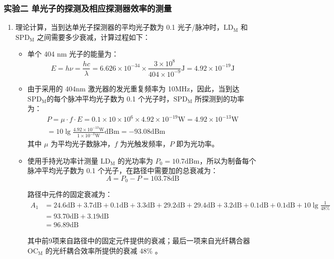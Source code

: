 \documentclass[dvipsnames, svgnames,a4paper,11pt]{article}
\begin{document}
	\subsubsection{实验二 \quad 单光子的探测及相应探测器效率的测量}
	\label{subsection2.1.2}

		\begin{enumerate}
			\item 理论计算，当到达单光子探测器的平均光子数为 0.1 光子/脉冲时，$\mathrm{LD_M}$ 和 $\mathrm{SPD_M}$ 之间需要多少衰减，计算过程如下：
				\begin{itemize}
					\item 单个 404 nm 光子的能量为：
						$$ E = h \nu = \frac{h c}{\lambda} = 6.626 \times 10^{-34} \times \frac{3 \times 10^{8}}{404 \times 10^{-9}} \mathrm{J} = 4.92 \times 10^{-19} \mathrm{J} $$

					\item 由于采用的 404nm 激光器的发光重复频率为 10MHz，因此，当到达$\mathrm{SPD_M}$的每个脉冲平均光子数为 0.1 个光子时，$\mathrm{SPD_M}$ 所探测到的功率为：
						\begin{align*}
							P = \mu \cdot f \cdot E = 0.1 \times 10 \times 10^{6} \times 4.92 \times 10^{-19} \mathrm{W} = 4.92 \times 10^{-13} \mathrm{W}	\\
							= 10 \lg \frac{4.92 \times 10^{-13} \mathrm{W}}{1 \times 10^{-3} \mathrm{W}} \mathrm{dBm} = -93.08 \mathrm{dBm}
						\end{align*}
					其中 $\mu$ 为平均光子数脉冲，$f$ 为光触发频率，$P$ 即为光功率。

					\item 使用手持光功率计测量 $\mathrm{LD_M}$ 的光功率为 $P_0 = 10.7 \mathrm{dBm}$，所以为制备每个脉冲平均光子数为 0.1 个光子，在路径中需要加的总衰减为：
						$$ A = P_0 - P = 103.78 \mathrm{dB} $$
						
						路径中元件的固定衰减为：
						\begin{align*}
							A_1 &= 24.6 \mathrm{dB} + 3.7 \mathrm{dB} + 0.1 \mathrm{dB} + 3.3 \mathrm{dB} + 29.2 \mathrm{dB} + 29.4 \mathrm{dB} + 3.2 \mathrm{dB} + 0.1 \mathrm{dB} + 0.1 \mathrm{dB} + 10 \lg \frac{1}{48\%} \\
							&= 93.70 \mathrm{dB} + 3.19 \mathrm{dB} \\
							&= 96.89 \mathrm{dB}
						\end{align*}

						其中前9项来自路径中的固定元件提供的衰减；最后一项来自光纤耦合器 $\mathrm{OC_M}$ 的光纤耦合效率所提供的衰减 48\% 。


\end{itemize}
\end{enumerate}
\end{document}
